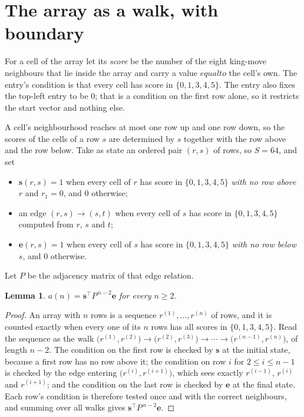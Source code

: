 \documentclass[11pt,a4paper]{article}
\theoremstyle{plain}
\newtheorem{lemma}[theorem]{Lemma}
\theoremstyle{definition}
\begin{document}
\section{The array as a walk, with boundary}

For a cell of the array let its \emph{score} be the number of the eight king-move neighbours that lie inside
the array and carry a value $equal to$ the cell's own. The entry's condition is that every cell
has score in $\{0,1,3,4,5\}$. The entry also fixes the top-left entry to be $0$; that is a condition on the first row alone, so it restricts the start vector and nothing else.

A cell's neighbourhood reaches at most one row up and one row down, so the scores of the
cells of a row $s$ are determined by $s$ together with the row above and the row below.
Take as state an ordered pair $(r,s)$ of rows, so $S=64$, and set
\begin{itemize}
\item $\mathbf{s}(r,s)=1$ when every cell of $r$ has score in $\{0,1,3,4,5\}$ \emph{with no row
above $r$} and $r_1=0$, and $0$ otherwise;
\item an edge $(r,s)\to(s,t)$ when every cell of $s$ has score in $\{0,1,3,4,5\}$ computed from
$r$, $s$ and $t$;
\item $\mathbf{e}(r,s)=1$ when every cell of $s$ has score in $\{0,1,3,4,5\}$ \emph{with no row
below $s$}, and $0$ otherwise.
\end{itemize}
Let $P$ be the adjacency matrix of that edge relation.

\begin{lemma}\label{lem:walk}
$a(n)=\mathbf{s}^{\!\top}P^{\,n-2}\mathbf{e}$ for every $n\ge2$.
\end{lemma}

\begin{proof}
An array with $n$ rows is a sequence $r^{(1)},\dots,r^{(n)}$ of rows, and it is counted
exactly when every one of its $n$ rows has all scores in $\{0,1,3,4,5\}$. Read the sequence as the
walk $\bigl(r^{(1)},r^{(2)}\bigr)\to\bigl(r^{(2)},r^{(3)}\bigr)\to\cdots\to
\bigl(r^{(n-1)},r^{(n)}\bigr)$, of length $n-2$. The condition on the first row is
checked by $\mathbf{s}$ at the initial state, because a first row has no row above it; the
condition on row $i$ for $2\le i\le n-1$ is checked by the edge entering
$\bigl(r^{(i)},r^{(i+1)}\bigr)$, which sees exactly $r^{(i-1)}$, $r^{(i)}$ and
$r^{(i+1)}$; and the condition on the last row is checked by $\mathbf{e}$ at the final
state. Each row's condition is therefore tested once and with the correct neighbours, and
summing over all walks gives $\mathbf{s}^{\!\top}P^{\,n-2}\mathbf{e}$.
\end{proof}
\end{document}
